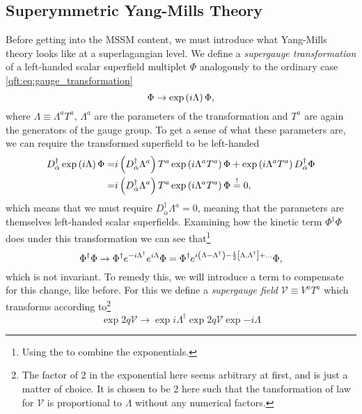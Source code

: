 \documentclass[../main.tex]{subfiles}
\begin{document}
\subsection{Superymmetric Yang-Mills Theory}
Before getting into the MSSM content, we must introduce what Yang-Mills theory
looks like at a superlagangian level. We define a \emph{supergauge
  transformation} of a left-handed scalar superfield multiplet \(\Phi\)
analogously to the ordinary case \cref{qft:eq:gauge_transformation}
\begin{equation}
  \label{susy:eq:supergauge_transformation}
  \Phi \to \operatorname{exp}\left(i \Lambda\right) \Phi,
\end{equation}
where \(\Lambda \equiv \Lambda^a T^a\), \(\Lambda^a\) are the parameters of the transformation and \(T^a\) are again the generators of the gauge group.
To get a sense of what these parameters are, we can require the transformed superfield to be left-handed
\begin{align*}
  D_{\dot{\alpha}}^\dagger \operatorname{exp}\left(i\Lambda\right) \Phi = & i\left(D_{\dot{\alpha}}^\dagger \Lambda^a\right) T^a \operatorname{exp}\left(i\Lambda^a T^a\right) \Phi + \operatorname{exp}\left(i\Lambda^a T^a\right) D_{\dot{\alpha}}^\dagger \Phi \\
  =                                                  & i\left(D_{\dot{\alpha}}^\dagger \Lambda^a\right) T^a \operatorname{exp}\left(i\Lambda^a T^a\right) \Phi \overset{!}{=} 0,
\end{align*}
which means that we must require \(D_{\dot{\alpha}}^\dagger \Lambda^a = 0\), meaning that the parameters are themselves left-handed scalar superfields.
Examining how the kinetic term \(\Phi^\dagger \Phi\) does under this transformation we can see that\footnote{Using the  to combine the exponentials.}
\begin{equation}
  \Phi^\dagger \Phi \to \Phi^\dagger e^{-i\Lambda^\dagger} e^{i\Lambda} \Phi = \Phi^\dagger e^{i\left(\Lambda - \Lambda^\dagger\right) - \frac{1}{2} \left[\Lambda,\Lambda^\dagger\right] + \ldots} \Phi,
\end{equation}
which is not invariant. To remedy this, we will introduce a term to compensate for this change, like before.
For this we define a   \emph{supergauge field} \(\mathcal{V} \equiv V^a T^a\) which transforms according to\footnote{The factor of 2 in the exponential here seems arbitrary at first, and is just a matter of choice. It is chosen to be 2 here such that the tansformation of law for \(\mathcal{V}\) is proportional to \(\Lambda\) without any numerical factors.}
\begin{equation}
  \exp{2q\mathcal{V}} \to \exp{i\Lambda^\dagger} \exp{2q\mathcal{V}} \exp{-i\Lambda}
\end{equation}
\end{document}
